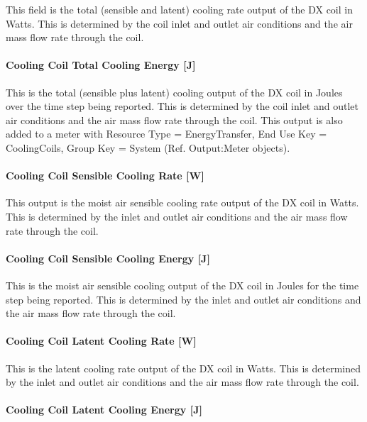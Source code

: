 This field is the total (sensible and latent) cooling rate output of the DX coil in Watts. This is determined by the coil inlet and outlet air conditions and the air mass flow rate through the coil.

\paragraph{Cooling Coil Total Cooling Energy {[}J{]}}\label{cooling-coil-total-cooling-energy-j-1}

This is the total (sensible plus latent) cooling output of the DX coil in Joules over the time step being reported. This is determined by the coil inlet and outlet air conditions and the air mass flow rate through the coil. This output is also added to a meter with Resource Type = EnergyTransfer, End Use Key = CoolingCoils, Group Key = System (Ref. Output:Meter objects).

\paragraph{Cooling Coil Sensible Cooling Rate {[}W{]}}\label{cooling-coil-sensible-cooling-rate-w-1}

This output is the moist air sensible cooling rate output of the DX coil in Watts. This is determined by the inlet and outlet air conditions and the air mass flow rate through the coil.

\paragraph{Cooling Coil Sensible Cooling Energy {[}J{]}}\label{cooling-coil-sensible-cooling-energy-j-1}

This is the moist air sensible cooling output of the DX coil in Joules for the time step being reported. This is determined by the inlet and outlet air conditions and the air mass flow rate through the coil.

\paragraph{Cooling Coil Latent Cooling Rate {[}W{]}}\label{cooling-coil-latent-cooling-rate-w}

This is the latent cooling rate output of the DX coil in Watts. This is determined by the inlet and outlet air conditions and the air mass flow rate through the coil.

\paragraph{Cooling Coil Latent Cooling Energy {[}J{]}}\label{cooling-coil-latent-cooling-energy-j}

